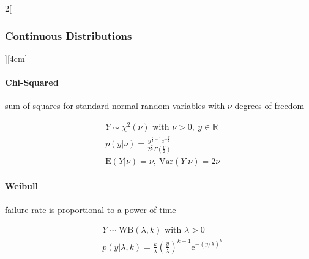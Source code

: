 \documentclass[8pt]{extarticle}
\begin{document}
\begin{multicols}{2}[\subsubsection{Continuous Distributions}][4cm]
  	\paragraph{Chi-Squared} sum of squares for standard normal random variables with $\nu$ degrees of freedom
  
    \begin{align*}
    & Y \sim \chi^2(\nu) \text{ with } \nu > 0,\: y \in \mathbb{R}\\
    & p(y|\nu) = \frac{y^{\frac{\nu}{2}-1}e^{-\frac{y}{2}}}{2^{\frac{\nu}{2}}\Gamma \left(\frac{\nu}{2}\right)} \\
    & \mathrm{E}(Y|\nu) = \nu, \:
	\mathrm{Var}(Y|\nu) = 2\nu
  \end{align*}
  
    \paragraph{Weibull} failure rate is proportional to a power of time
  
    \begin{align*}
    & Y \sim \mathrm{WB}(\lambda, k) \text{ with } \lambda> 0\\
    & p(y|\lambda,k) =
\frac{k}{\lambda}\left(\frac{y}{\lambda}\right)^{k-1}\mathrm{e}^{-(y/\lambda)^{k}} \\
  \end{align*}

\end{multicols}
\end{document}
